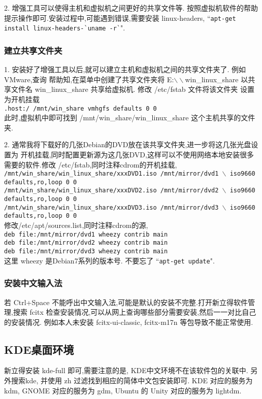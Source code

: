 \par
2. 增强工具可以使得主机和虚拟机之间更好的共享文件等. 按照虚拟机软件的帮助提示操作即可.安装过程中,可能遇到错误,需要安装 linux-headers, ``\verb"apt-get install linux-headers-`uname -r`"". 

\subsubsection{建立共享文件夹}
\par
1. 安装好了增强工具以后,就可以建立主机和虚拟机之间的共享文件夹了. 例如VMware,查询%
帮助知,在菜单中创建了共享文件夹将 E:$\backslash\backslash$win\_linux\_share 以共享文件名 win\_linux\_share 共享给虚拟机. 修改 /etc/fstab 文件将该文件夹%
设置为开机挂载\\ 
\indent\texttt{.host:/  /mnt/win\_share  vmhgfs  defaults  0  0} \\
此时,虚拟机中即可找到 /mnt/win\_share/win\_linux\_share 这个主机共享的文件夹.

\par
2. 通常我将下载好的几张Debian的DVD放在该共享文件夹,进一步将这几张光盘设置为%
开机挂载,同时配置更新源为这几张DVD,这样可以不使用网络本地安装很多需要的软件.修改 /etc/fstab,同时注释cdrom的开机挂载,\\
\indent\texttt{/mnt/win\_share/win\_linux\_share/xxxDVD1.iso /mnt/mirror/dvd1 $\backslash$ \newline \indent iso9660 defaults,ro,loop 0 0}\\
\indent\texttt{/mnt/win\_share/win\_linux\_share/xxxDVD2.iso /mnt/mirror/dvd2 $\backslash$ \newline \indent iso9660 defaults,ro,loop 0 0}\\
\indent\texttt{/mnt/win\_share/win\_linux\_share/xxxDVD3.iso /mnt/mirror/dvd3 $\backslash$ \newline \indent iso9660 defaults,ro,loop 0 0}\\
修改/etc/apt/sources.list,同时注释cdrom的源,\\
\indent\texttt{deb file:/mnt/mirror/dvd1 wheezy contrib main}\\
\indent\texttt{deb file:/mnt/mirror/dvd2 wheezy contrib main}\\
\indent\texttt{deb file:/mnt/mirror/dvd3 wheezy contrib main}\\
这里 wheezy 是Debian7系列的版本号. 不要忘了 ``\verb"apt-get update"".

\subsubsection{安装中文输入法}
若 Ctrl+Space 不能呼出中文输入法,可能是默认的安装不完整.打开新立得软件管理,搜索%
fcitx 检查安装情况,可以从网上查询哪些部分需要安装,然后一一对比自己的安装情况.%
例如本人未安装 fcitx-ui-classic, fcitx-m17n 等包导致不能正常使用.

\subsection{KDE桌面环境}
新立得安装 kde-full 即可,需要注意的是, KDE中文环境不在该软件包的关联中. 另外搜索kde, 并使用 zh 过滤找到相应的简体中文包安装即可. KDE 对应的服务为 kdm, GNOME 对应的服务为 gdm, Ubuntu 的 Unity 对应的服务为 lightdm.


